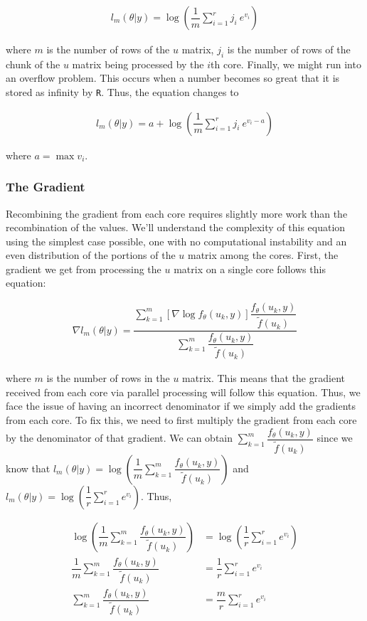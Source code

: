 \documentclass{article}
\begin{document}
\begin{align}
l_m(\theta|y) = \log\left(\dfrac{1}{m}\sum\limits_{i=1}^r j_i \ e^{v_i}\right)
\end{align}

\noindent where $m$ is the number of rows of the $u$ matrix, $j_i$ is the number of rows of the chunk of the $u$ matrix being processed by the $i$th core. Finally, we might run into an overflow problem. This occurs when a number becomes so great that it is stored as infinity by \texttt{R}. Thus, the equation changes to 

\begin{align}
l_m(\theta|y) = a + \log\left(\dfrac{1}{m}\sum\limits_{i=1}^r j_i \ e^{v_i - a}\right)
\end{align}

\noindent where $a = \max{v_i}$.

\subsubsection{The Gradient}
Recombining the gradient from each core requires slightly more work than the recombination of the values. We'll understand the complexity of this equation using the simplest case possible, one with no computational instability and an even distribution of the portions of the $u$ matrix among the cores. First, the gradient we get from processing the $u$ matrix on a single core follows this equation: 

\begin{align}
\nabla l_m(\theta|y)=
\dfrac{\sum_{k=1}^m   \left[  \nabla  \log f_\theta(u_k,y) \right]  \dfrac{f_\theta(u_k,y)}{\tilde{f}(u_k)} }{\sum_{k=1}^m  \dfrac{f_\theta(u_k,y)}{\tilde{f}(u_k)}  } 
\end{align}

\noindent where $m$ is the number of rows in the $u$ matrix. This means that the gradient received from each core via parallel processing will follow this equation. Thus, we face the issue of having an incorrect denominator if we simply add the gradients from each core. To fix this, we need to first multiply the gradient from each core by the denominator of that gradient. We can obtain $\sum_{k=1}^m  \dfrac{f_\theta(u_k,y)}{\tilde{f}(u_k)}$ since we know that $l_{m}(\theta|y) = \log \left( \dfrac{1}{m} \sum_{k=1}^m  \dfrac{ f_\theta(u_k,y)   }{\tilde{f}(u_k)} \right)$ and $l_m(\theta|y) = \log\left(\dfrac{1}{r}\sum\limits_{i=1}^r e^{v_i}\right)$. Thus, 

\begin{align}
\log \left( \dfrac{1}{m} \sum_{k=1}^m  \dfrac{ f_\theta(u_k,y)   }{\tilde{f}(u_k)} \right) &= \log\left(\dfrac{1}{r}\sum\limits_{i=1}^r e^{v_i}\right) \\
\dfrac{1}{m} \sum_{k=1}^m  \dfrac{ f_\theta(u_k,y)   }{\tilde{f}(u_k)}  &= \dfrac{1}{r}\sum\limits_{i=1}^r e^{v_i} \\
\sum_{k=1}^m  \dfrac{ f_\theta(u_k,y)   }{\tilde{f}(u_k)}  &= \dfrac{m}{r} \sum\limits_{i=1}^r e^{v_i}
\end{align}
\end{document}
